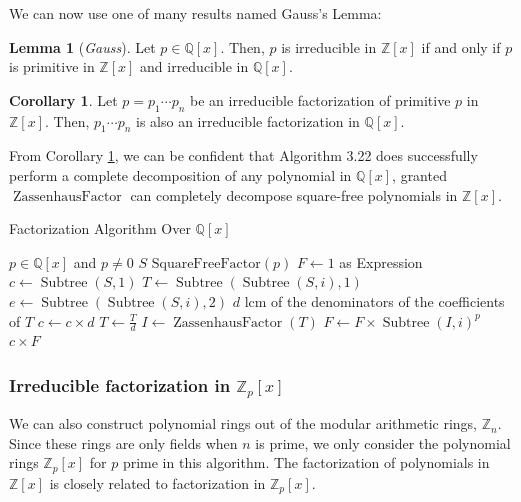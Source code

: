\documentclass{article}
\theoremstyle{definition}
\newtheorem{corollary}[thm]{Corollary}
\newtheorem{lemma}[thm]{Lemma}
\DeclareMathOperator{\subtree}{Subtree}
\DeclareMathOperator{\args}{Args}
\DeclareMathOperator{\zass}{ZassenhausFactor}
\begin{document}
    We can now use one of many results named Gauss's Lemma:
    
    \begin{lemma}[\itshape Gauss]
        Let $p \in \mathbb{Q}[x]$. Then, $p$ is irreducible in $\mathbb{Z}[x]$ if and only if $p$ is primitive in $\mathbb{Z}[x]$ and irreducible in $\mathbb{Q}[x]$.
    \end{lemma}
    
    \begin{corollary} \label{cor1}
        Let $p = p_1\cdots p_n$ be an irreducible factorization of primitive $p$ in $\mathbb{Z}[x]$. Then, $p_1\cdots p_n$ is also an irreducible factorization in $\mathbb{Q}[x]$.
    \end{corollary}
    
    From Corollary \ref{cor1}, we can be confident that Algorithm 3.22 does successfully perform a complete decomposition of any polynomial in $\mathbb{Q}[x]$, granted $\zass$ can completely decompose square-free polynomials in $\mathbb{Z}[x]$.
    
    \begin{algorithm} \label{alg2}
    \caption{Factorization Algorithm Over $\mathbb{Q}[x]$}
        \begin{algorithmic}[1]
            \Require $p \in \mathbb{Q}[x]$ and $p \neq 0$
            \State $S$ \gets
            $\text{SquareFreeFactor}(p)$
            \State $F \gets 1$ as Expression
            \State $c \gets \subtree(S, 1)$
            \For{$i \in \{2, \ldots, \args(S)\}$}
                \State $T \gets \subtree(\subtree(S, i),1)$
                \State $e \gets \subtree(\subtree(S, i),2)$
                \State $d$ \gets lcm of the denominators of the coefficients of $T$
                \State $c \gets c \times d$
                \State $T \gets \frac{T}{d}$
                \State $I \gets \zass(T)$
                \For{$i \in \{1, \ldots, \args(I)\}$}
                    \State $F \gets F \times \subtree(I, i)^p$
                \EndFor
            \EndFor
            \State \Return $c \times F$
        \end{algorithmic}
    \end{algorithm}
    
    \subsubsection{Irreducible factorization in $\mathbb{Z}_p[x]$}
    
    We can also construct polynomial rings out of the modular arithmetic rings, $\mathbb{Z}_n$. Since these rings are only fields when $n$ is prime, we only consider the polynomial rings $\mathbb{Z}_p[x]$ for $p$ prime in this algorithm.  The factorization of polynomials in $\mathbb{Z}[x]$ is closely related to factorization in $\mathbb{Z}_p[x]$.
    
\end{document}
